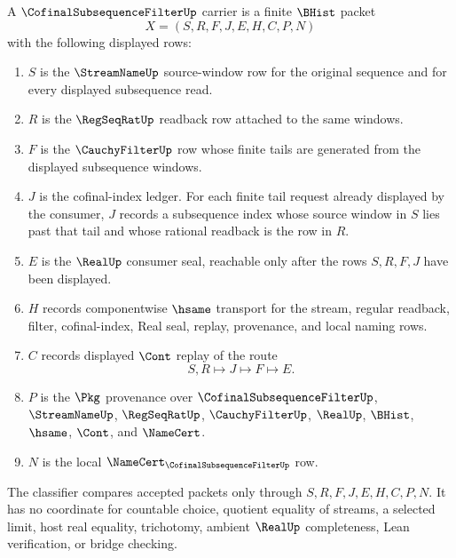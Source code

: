 \begin{definition}
\label{def:cofinal-subsequence-filter-carrier}
A $\CofinalSubsequenceFilterUp$ carrier is a finite $\BHist$ packet
$$
X=(S,R,F,J,E,H,C,P,N)
$$
with the following displayed rows:
\begin{enumerate}
\item $S$ is the $\StreamNameUp$ source-window row for the original sequence and for every displayed subsequence read.
\item $R$ is the $\RegSeqRatUp$ readback row attached to the same windows.
\item $F$ is the $\CauchyFilterUp$ row whose finite tails are generated from the displayed subsequence windows.
\item $J$ is the cofinal-index ledger. For each finite tail request already displayed by the consumer, $J$ records a subsequence index whose source window in $S$ lies past that tail and whose rational readback is the row in $R$.
\item $E$ is the $\RealUp$ consumer seal, reachable only after the rows $S,R,F,J$ have been displayed.
\item $H$ records componentwise $\hsame$ transport for the stream, regular readback, filter, cofinal-index, Real seal, replay, provenance, and local naming rows.
\item $C$ records displayed $\Cont$ replay of the route
$$
S,R \longmapsto J \longmapsto F \longmapsto E .
$$
\item $P$ is the $\Pkg$ provenance over $\CofinalSubsequenceFilterUp$, $\StreamNameUp$, $\RegSeqRatUp$, $\CauchyFilterUp$, $\RealUp$, $\BHist$, $\hsame$, $\Cont$, and $\NameCert$.
\item $N$ is the local $\NameCert_{\CofinalSubsequenceFilterUp}$ row.
\end{enumerate}
The classifier compares accepted packets only through $S,R,F,J,E,H,C,P,N$. It has no coordinate for countable choice, quotient equality of streams, a selected limit, host real equality, trichotomy, ambient $\RealUp$ completeness, Lean verification, or bridge checking.
\end{definition}

